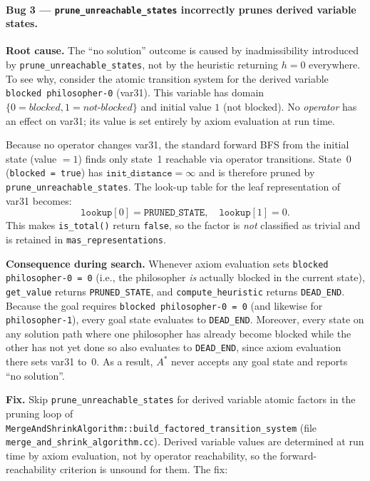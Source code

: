 \documentclass[11pt,a4paper]{article}
\begin{document}
\paragraph{Bug 3 — \texttt{prune\_unreachable\_states} incorrectly prunes derived variable states.}

\textbf{Root cause.}
The ``no solution'' outcome is caused by inadmissibility introduced by
\texttt{prune\_unreachable\_states}, not by the heuristic returning $h = 0$
everywhere.  To see why, consider the atomic transition system for the derived
variable \texttt{blocked philosopher-0} (var31).  This variable has domain
$\{0 = \textit{blocked}, 1 = \textit{not-blocked}\}$ and initial value
$1$ (not blocked).  No \emph{operator} has an effect on var31; its value is
set entirely by axiom evaluation at run time.

Because no operator changes var31, the standard forward BFS from the initial
state (value $= 1$) finds only state~1 reachable via operator transitions.
State~0 (\texttt{blocked~= true}) has $\texttt{init\_distance} = \infty$ and
is therefore pruned by \texttt{prune\_unreachable\_states}.  The look-up table
for the leaf representation of var31 becomes:
\[
  \texttt{lookup}[0] = \texttt{PRUNED\_STATE},\quad
  \texttt{lookup}[1] = 0.
\]
This makes \texttt{is\_total()} return \texttt{false}, so the factor is \emph{not}
classified as trivial and is retained in \texttt{mas\_representations}.

\textbf{Consequence during search.}
Whenever axiom evaluation sets \texttt{blocked philosopher-0 = 0} (i.e., the
philosopher \emph{is} actually blocked in the current state),
\texttt{get\_value} returns \texttt{PRUNED\_STATE}, and
\texttt{compute\_heuristic} returns \texttt{DEAD\_END}.  Because the goal
requires \texttt{blocked philosopher-0 = 0} (and likewise for
\texttt{philosopher-1}), every goal state evaluates to \texttt{DEAD\_END}.
Moreover, every state on any solution path where one philosopher has already
become blocked while the other has not yet done so also evaluates to
\texttt{DEAD\_END}, since axiom evaluation there sets var31 to~0.  As a
result, $A^*$ never accepts any goal state and reports ``no solution''.

\textbf{Fix.}
Skip \texttt{prune\_unreachable\_states} for derived variable atomic factors in
the pruning loop of \texttt{MergeAndShrinkAlgorithm::build\_factored\_transition\_system}
(file \texttt{merge\_and\_shrink\_algorithm.cc}).  Derived variable values are
determined at run time by axiom evaluation, not by operator reachability, so
the forward-reachability criterion is unsound for them.  The fix:
\end{document}
